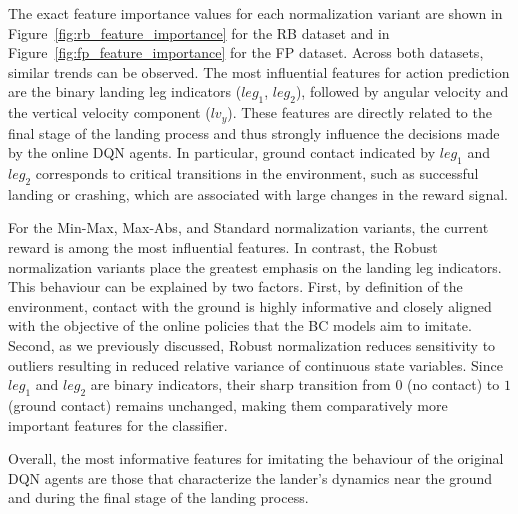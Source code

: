 The exact feature importance values for each normalization variant are shown in Figure~\ref{fig:rb_feature_importance} for the RB dataset and in Figure~\ref{fig:fp_feature_importance} for the FP dataset. Across both datasets, similar trends can be observed. The most influential features for action prediction are the binary landing leg indicators ($leg_1$, $leg_2$), followed by angular velocity and the vertical velocity component ($lv_y$). These features are directly related to the final stage of the landing process and thus strongly influence the decisions made by the online DQN agents. In particular, ground contact indicated by $leg_1$ and $leg_2$ corresponds to critical transitions in the environment, such as successful landing or crashing, which are associated with large changes in the reward signal.

For the Min-Max, Max-Abs, and Standard normalization variants, the current reward is among the most influential features. In contrast, the Robust normalization variants place the greatest emphasis on the landing leg indicators. This behaviour can be explained by two factors. First, by definition of the environment, contact with the ground is highly informative and closely aligned with the objective of the online policies that the BC models aim to imitate. Second, as we previously discussed, Robust normalization reduces sensitivity to outliers resulting in reduced relative variance of continuous state variables. Since $leg_1$ and $leg_2$ are binary indicators, their sharp transition from $0$ (no contact) to $1$ (ground contact) remains unchanged, making them comparatively more important features for the classifier.


Overall, the most informative features for imitating the behaviour of the original DQN agents are those that characterize the lander's dynamics near the ground and during the final stage of the landing process.
